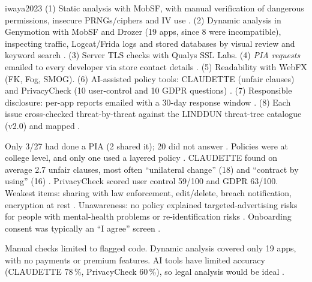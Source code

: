 \begin{papercard}{iwaya2023}
 (1) Static analysis with MobSF, with manual verification of dangerous permissions, insecure PRNGs/ciphers and IV use . (2) Dynamic analysis in Genymotion with MobSF and Drozer (19 apps, since 8 were incompatible), inspecting traffic, Logcat/Frida logs and stored databases by visual review and keyword search . (3) Server TLS checks with Qualys SSL Labs. (4) \emph{PIA requests} emailed to every developer via store contact details . (5) Readability with WebFX (FK, Fog, SMOG). (6) AI-assisted policy tools: CLAUDETTE (unfair clauses) and PrivacyCheck (10 user-control and 10 GDPR questions) . (7) Responsible disclosure: per-app reports emailed with a 30-day response window . (8) Each issue cross-checked threat-by-threat against the LINDDUN threat-tree catalogue (v2.0) and mapped .

 Only 3/27 had done a PIA (2 shared it); 20 did not answer . Policies were at college level, and only one used a layered policy . CLAUDETTE found on average 2.7 unfair clauses, most often ``unilateral change'' (18) and ``contract by using'' (16) . PrivacyCheck scored user control 59/100 and GDPR 63/100. Weakest items: sharing with law enforcement, edit/delete, breach notification, encryption at rest . Unawareness: no policy explained targeted-advertising risks for people with mental-health problems or re-identification risks . Onboarding consent was typically an ``I agree'' screen .

 Manual checks limited to flagged code. Dynamic analysis covered only 19 apps, with no payments or premium features. AI tools have limited accuracy (CLAUDETTE 78\,\%, PrivacyCheck 60\,\%), so legal analysis would be ideal .


\end{papercard}
